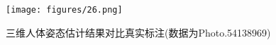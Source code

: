 \begin{figure}[h]
	\centering
	\texttt{[image: figures/26.png]}
	\caption{三维人体姿态估计结果对比真实标注(数据为Photo.54138969)}
	\label{fig:f26}
\end{figure}













